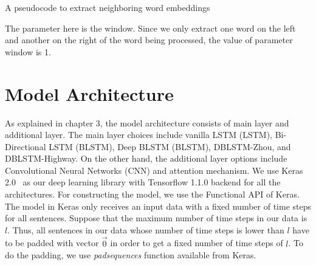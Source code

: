 \begin{kode}	
	
	\SetAlgoLined
	\caption{A pseudocode to extract neighboring word embeddings}
	\label{code:neighboringwe}	
\end{kode}

The parameter here is the window. Since we only extract one word on the left and another on the right of the word being processed, the value of parameter window is 1.

\section{Model Architecture}
As explained in chapter 3, the model architecture consists of main layer and additional layer. The main layer choices include vanilla LSTM (LSTM), Bi-Directional LSTM (BLSTM), Deep BLSTM (BLSTM), DBLSTM-Zhou, and DBLSTM-Highway. On the other hand, the additional layer options include Convolutional Neural Networks (CNN) and attention mechanism. We use Keras 2.0~\citep{chollet2015} as our deep learning library with Tensorflow 1.1.0 backend for all the architectures. For constructing the model, we use the Functional API of Keras. The model in Keras only receives an input data with a fixed number of time steps for all sentences. Suppose that the maximum number of time steps in our data is $l$. Thus, all sentences in our data whose number of time steps is lower than $l$ have to be padded with vector $ \vec{0}$ in order to get a fixed number of time steps of $l$. To do the padding, we use \textit{padsequences} function available from Keras.

